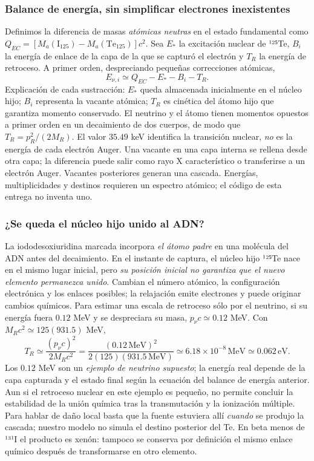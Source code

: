 \documentclass[11pt,a4paper,oneside]{article}
\begin{document}
\subsubsection{Balance de energía, sin simplificar electrones inexistentes}\label{balance-de-energuxeda-sin-simplificar-electrones-inexistentes}

Definimos la diferencia de masas \emph{atómicas neutras} en el estado fundamental como \(Q_{EC}=[M_a(\mathrm{I}_{125})-M_a(\mathrm{Te}_{125})]c^2\). Sea \(E_*\) la excitación nuclear de ¹²⁵Te, \(B_i\) la energía de enlace de la capa de la que se capturó el electrón y \(T_R\) la energía de retroceso. A primer orden, despreciando pequeñas correcciones atómicas, \[E_{\nu,i}\simeq Q_{EC}-E_*-B_i-T_R.\] Explicación de cada sustracción: \(E_*\) queda almacenada inicialmente en el núcleo hijo; \(B_i\) representa la vacante atómica; \(T_R\) es cinética del átomo hijo que garantiza momento conservado. El neutrino y el átomo tienen momentos opuestos a primer orden en un decaimiento de dos cuerpos, de modo que \(T_R=p_R^2/(2M_R)\). El valor \(35.49\) keV identifica la transición nuclear, \emph{no} es la energía de cada electrón Auger. Una vacante en una capa interna se rellena desde otra capa; la diferencia puede salir como rayo X característico o transferirse a un electrón Auger. Vacantes posteriores generan una cascada. Energías, multiplicidades y destinos requieren un espectro atómico; el código de esta entrega no inventa uno.

\subsubsection{¿Se queda el núcleo hijo unido al ADN?}\label{se-queda-el-nuxfacleo-hijo-unido-al-adn}

La iododesoxiuridina marcada incorpora \emph{el átomo padre} en una molécula del ADN antes del decaimiento. En el instante de captura, el núcleo hijo ¹²⁵Te nace en el mismo lugar inicial, pero \emph{su posición inicial no garantiza que el nuevo elemento permanezca unido}. Cambian el número atómico, la configuración electrónica y los enlaces posibles; la relajación emite electrones y puede originar cambios químicos. Para estimar una escala de retroceso sólo por el neutrino, si su energía fuera \(0.12\) MeV y se despreciara su masa, \(p_\nu c\simeq0.12\) MeV. Con \(M_Rc^2\simeq125(931.5)\) MeV, \[T_R\simeq\frac{(p_\nu c)^2}{2M_Rc^2}=\frac{(0.12\,\mathrm{MeV})^2}{2(125)(931.5\,\mathrm{MeV})}\simeq6.18\times10^{-8}\,\mathrm{MeV}\simeq0.062\,\mathrm{eV}.\] Los \(0.12\) MeV son un \emph{ejemplo de neutrino supuesto}; la energía real depende de la capa capturada y el estado final según la ecuación del balance de energía anterior. Aun si el retroceso nuclear en este ejemplo es pequeño, no permite concluir la estabilidad de la unión química tras la transmutación y la ionización múltiple. Para hablar de daño local basta que la fuente estuviera allí \emph{cuando} se produjo la cascada; nuestro modelo no simula el destino posterior del Te. En beta menos de ¹³¹I el producto es xenón: tampoco se conserva por definición el mismo enlace químico después de transformarse en otro elemento.
\end{document}

